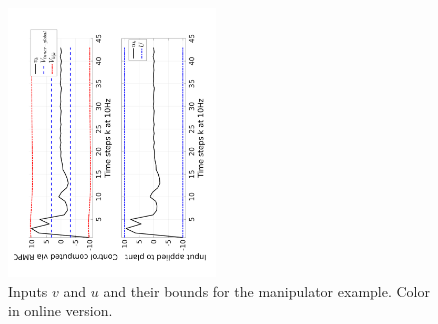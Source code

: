 

\begin{figure}
\includegraphics[angle=270,width=0.49\textwidth]{figs/u_and_v_manip.pdf}
\caption{Inputs $v$ and $u$ and their bounds for the manipulator example. Color in online version.}
\label{fig:v_and_limits}
\end{figure}






